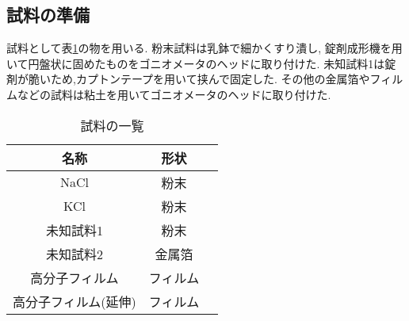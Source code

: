 \subsection{試料の準備}
試料として表\ref{tab:siryou}の物を用いる.
粉末試料は乳鉢で細かくすり潰し,
錠剤成形機を用いて円盤状に固めたものをゴニオメータのヘッドに取り付けた.
未知試料1は錠剤が脆いため,カプトンテープを用いて挟んで固定した.
その他の金属箔やフィルムなどの試料は粘土を用いてゴニオメータのヘッドに取り付けた.
\begin{table}[h]
  \caption{試料の一覧}
  \label{tab:siryou}
  \centering
  \begin{tabular}{ccc}
  \hline
  名称&形状\\
  \hline \hline
  NaCl&粉末\\
  KCl&粉末\\
  未知試料1&粉末\\
  未知試料2&金属箔\\
  高分子フィルム&フィルム\\
  高分子フィルム(延伸)&フィルム\\
  \hline
  \end{tabular}
\end{table}
